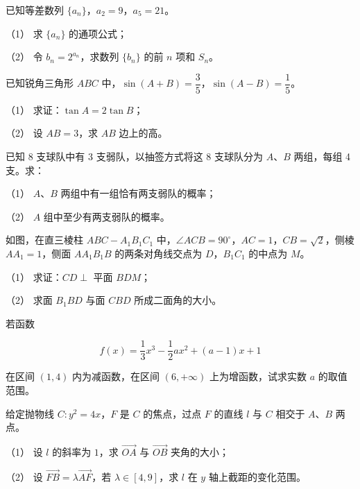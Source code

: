\begin{question}
已知等差数列 $\{a_n\}$，$a_2=9$，$a_5=21$。

（1） 求 $\{a_n\}$ 的通项公式；

（2） 令 $b_n=2^{a_n}$，求数列 $\{b_n\}$ 的前 $n$ 项和 $S_n$。

\end{question}
\begin{question}
已知锐角三角形 $ABC$ 中，$\sin(A+B)=\dfrac35$，$\sin(A-B)=\dfrac15$。

（1） 求证：$\tan A=2\tan B$；

（2） 设 $AB=3$，求 $AB$ 边上的高。

\end{question}
\begin{question}
已知 8 支球队中有 3 支弱队，以抽签方式将这 8 支球队分为 $A\text{、}B$ 两组，每组 4 支。求：

（1） $A\text{、}B$ 两组中有一组恰有两支弱队的概率；

（2） $A$ 组中至少有两支弱队的概率。

\Needspace{0.4\textheight}
\end{question}
\begin{question}
如图，在直三棱柱 $ABC-A_1B_1C_1$ 中，$\angle ACB=90^\circ$，$AC=1$，$CB=\sqrt2$，侧棱 $AA_1=1$，侧面 $AA_1B_1B$ 的两条对角线交点为 $D$，$B_1C_1$ 的中点为 $M$。
\nopagebreak[4]
\begin{center}\end{center}
\nopagebreak[4]
（1） 求证：$CD\perp$ 平面 $BDM$；

（2） 求面 $B_1BD$ 与面 $CBD$ 所成二面角的大小。

\end{question}
\begin{question}
若函数

\nopagebreak[4]
\[
f(x)=\frac13x^3-\frac12ax^2+(a-1)x+1
\]

在区间 $(1,4)$ 内为减函数，在区间 $(6,+\infty)$ 上为增函数，试求实数 $a$ 的取值范围。

\end{question}
\begin{question}
给定抛物线 $C:y^2=4x$，$F$ 是 $C$ 的焦点，过点 $F$ 的直线 $l$ 与 $C$ 相交于 $A\text{、}B$ 两点。

（1） 设 $l$ 的斜率为 $1$，求 $\overrightarrow{OA}$ 与 $\overrightarrow{OB}$ 夹角的大小；

（2） 设 $\overrightarrow{FB}=\lambda\overrightarrow{AF}$，若 $\lambda\in[4,9]$，求 $l$ 在 $y$ 轴上截距的变化范围。

\end{question}